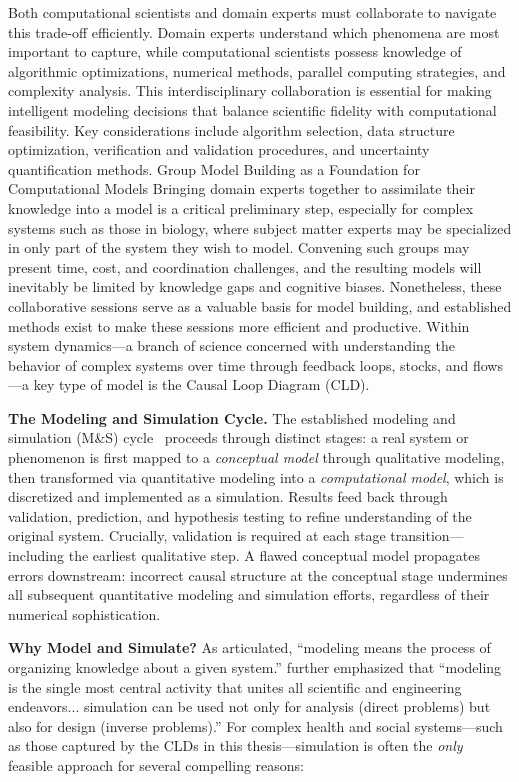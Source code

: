 \documentclass[12pt]{article}
\begin{document}
Both computational scientists and domain experts must collaborate to navigate this trade-off efficiently. Domain experts understand which phenomena are most important to capture, while computational scientists possess knowledge of algorithmic optimizations, numerical methods, parallel computing strategies, and complexity analysis. This interdisciplinary collaboration is essential for making intelligent modeling decisions that balance scientific fidelity with computational feasibility. Key considerations include algorithm selection, data structure optimization, verification and validation procedures, and uncertainty quantification methods.
Group Model Building as a Foundation for Computational Models
Bringing domain experts together to assimilate their knowledge into a model is a critical preliminary step, especially for complex systems such as those in biology, where subject matter experts may be specialized in only part of the system they wish to model. Convening such groups may present time, cost, and coordination challenges, and the resulting models will inevitably be limited by knowledge gaps and cognitive biases. Nonetheless, these collaborative sessions serve as a valuable basis for model building, and established methods exist to make these sessions more efficient and productive.
Within system dynamics—a branch of science concerned with understanding the behavior of complex systems over time through feedback loops, stocks, and flows—a key type of model is the Causal Loop Diagram (CLD).

\medskip
\noindent
\textbf{The Modeling and Simulation Cycle.} The established modeling and simulation (M\&S) cycle~\citep{ziegler1976theory, cellier1990continuous} proceeds through distinct stages: a real system or phenomenon is first mapped to a \emph{conceptual model} through qualitative modeling, then transformed via quantitative modeling into a \emph{computational model}, which is discretized and implemented as a simulation. Results feed back through validation, prediction, and hypothesis testing to refine understanding of the original system. Crucially, validation is required at each stage transition—including the earliest qualitative step. A flawed conceptual model propagates errors downstream: incorrect causal structure at the conceptual stage undermines all subsequent quantitative modeling and simulation efforts, regardless of their numerical sophistication.

\medskip
\noindent
\textbf{Why Model and Simulate?} As \citet{ziegler1976theory} articulated, ``modeling means the process of organizing knowledge about a given system.'' \citet{cellier1990continuous} further emphasized that ``modeling is the single most central activity that unites all scientific and engineering endeavors... simulation can be used not only for analysis (direct problems) but also for design (inverse problems).'' For complex health and social systems---such as those captured by the CLDs in this thesis---simulation is often the \emph{only} feasible approach for several compelling reasons:
\end{document}
